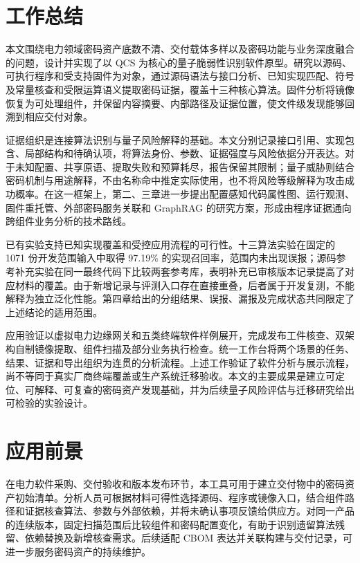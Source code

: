 \section{工作总结}

本文围绕电力领域密码资产底数不清、交付载体多样以及密码功能与业务深度融合的问题，设计并实现了以 QCS 为核心的量子脆弱性识别软件原型。研究以源码、可执行程序和受支持固件为对象，通过源码语法与接口分析、已知实现匹配、符号及常量核查和受限运算语义提取密码证据，覆盖十三种核心算法。固件分析将镜像恢复为可处理组件，并保留内容摘要、内部路径及证据位置，使文件级发现能够回溯到相应交付对象。

证据组织是连接算法识别与量子风险解释的基础。本文分别记录接口引用、实现包含、局部结构和待确认项，将算法身份、参数、证据强度与风险依据分开表达。对于未知配置、共享原语、提取失败和预算耗尽，报告保留其限制；量子威胁则结合密码机制与用途解释，不由名称命中推定实际使用，也不将风险等级解释为攻击成功概率。在这一框架上，第二、三章进一步提出配置感知代码属性图、运行观测、固件重托管、外部密码服务关联和 GraphRAG 的研究方案，形成由程序证据通向跨组件业务分析的技术路线。

已有实验支持已知实现覆盖和受控应用流程的可行性。十三算法实验在固定的 1071 份开发范围输入中取得 97.19\% 的实现召回率，范围内未出现误报；源码参考补充实验在同一最终代码下比较两套参考库，表明补充已审核版本记录提高了对应材料的覆盖。由于新增记录与评测入口存在直接重叠，后者属于开发复测，不能解释为独立泛化性能。第四章给出的分组结果、误报、漏报及完成状态共同限定了上述结论的适用范围。

应用验证以虚拟电力边缘网关和五类终端软件样例展开，完成发布工件核查、双架构自制镜像提取、组件扫描及部分业务执行检查。统一工作台将两个场景的任务、结果、证据和导出组织为连贯的分析流程。上述工作验证了软件分析与展示流程，尚不等同于真实厂商终端覆盖或生产系统迁移验收。本文的主要成果是建立可定位、可解释、可复查的密码资产发现基础，并为后续量子风险评估与迁移研究给出可检验的实验设计。

\section{应用前景}

在电力软件采购、交付验收和版本发布环节，本工具可用于建立交付物中的密码资产初始清单。分析人员可根据材料可得性选择源码、程序或镜像入口，结合组件路径和证据核查算法、参数与外部依赖，并将未确认事项反馈给供应方。对同一产品的连续版本，固定扫描范围后比较组件和密码配置变化，有助于识别遗留算法残留、依赖替换及新增核查需求。后续适配 CBOM 表达并关联构建与交付记录，可进一步服务密码资产的持续维护\cite{cbom16,nccoe180038}。

